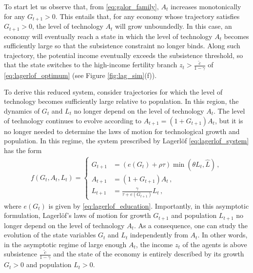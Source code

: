 \documentclass[a4paper,fleqn]{cas-sc}
\begin{document}
To start let us observe that, from \eqref{eq:galor_family}, $A_t$ increases monotonically for any $G_{t+1}>0$. This entails that, for any economy whose trajectory satisfies $G_{t+1}>0$, the level of technology $A_t$ will grow unboundedly. 
In this case, an economy will eventually reach a state in which the level of technology $A_t$ becomes sufficiently large so that the subsistence constraint no longer binds.
Along such trajectory, the potential income eventually exceeds the subsistence threshold, so that the state switches to the high-income fertility branch $z_t>\frac{\tilde{c}}{1-\gamma}$ of \eqref{eq:lagerlof_optimum} (see Figure \ref{fig:lag_sim}(f)).

To derive this reduced system, consider trajectories for which the level of technology becomes sufficiently large relative to population.  In this region, the dynamics of $G_t$ and $L_t$ no longer depend on the level of technology $A_t$. The level of technology continues to evolve according to $A_{t+1}=(1+G_{t+1})A_t$, but it is no longer needed to determine the laws of motion for technological growth and population.
In this regime, the system prescribed by Lagerl\"{o}f \eqref{eq:lagerlof_system} has the form
%
\begin{align*}
    f(G_t,A_t,L_t)=
    \begin{cases}
        G_{t+1} &= (e(G_t) + \rho\tau)\min(\theta L_t, \hat L)\,, \\
        A_{t+1} &= (1 + G_{t+1})A_t\,, \\
        L_{t+1} &= \frac{\gamma}{\tau + e(G_{t+1})} L_t\,,
    \end{cases}
\end{align*}
%
where $e(G_t)$ is given by \eqref{eq:lagerlof_education}.
Importantly, in this asymptotic formulation, Lagerl\"{o}f's laws of motion for growth $G_{t+1}$ and population $L_{t+1}$ no longer depend on the level of technology $A_t$. 
As a consequence, one can study the evolution of the state variables $G_t$ and $L_t$ independently from $A_t$. 
In other words, in the asymptotic regime of large enough $A_t$, the income $z_t$ of the agents is above subsistence $\frac{\tilde{c}}{1-\gamma}$ and the state of the economy is entirely described by its growth $G_t>0$ and population $L_t>0$.
\end{document}
